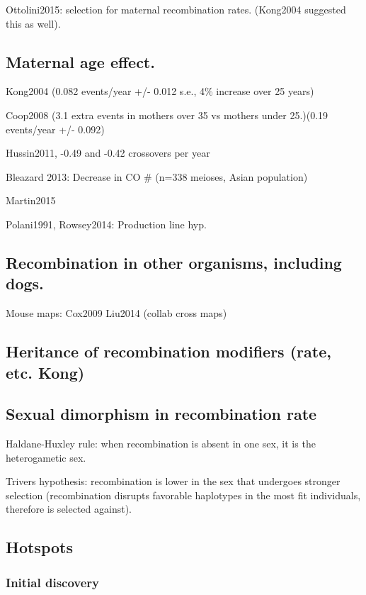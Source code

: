Ottolini2015: selection for maternal recombination rates. (Kong2004 suggested this as well).

\subsection{Maternal age effect.}

Kong2004 (0.082 events/year +/- 0.012 s.e., 4\% increase over 25 years)

Coop2008 (3.1 extra events in mothers over 35 vs mothers under 25.)(0.19 events/year +/- 0.092)

Hussin2011, -0.49 and -0.42 crossovers per year

Bleazard 2013: Decrease in CO \# (n=338 meioses, Asian population)

Martin2015

Polani1991, Rowsey2014: Production line hyp.

\subsection{Recombination in other organisms, including dogs.}

Mouse maps:
Cox2009
Liu2014 (collab cross maps)

\subsection{Heritance of recombination modifiers (rate, etc. Kong)}
\subsection{Sexual dimorphism in recombination rate}

Haldane-Huxley rule: when recombination is absent in one sex, it is the heterogametic sex.

Trivers hypothesis: recombination is lower in the sex that undergoes stronger selection (recombination disrupts favorable haplotypes in the most fit individuals, therefore is selected against).

\subsection{Hotspots}

\subsubsection{Initial discovery}

